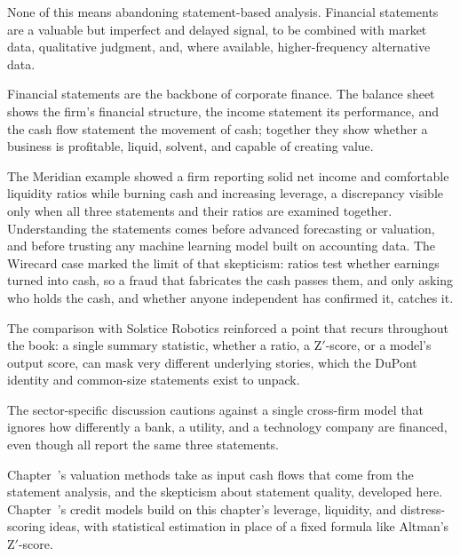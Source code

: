 \documentclass[../ai_in_finance]{subfiles}
\begin{document}
None of this means abandoning statement-based analysis. Financial statements are a valuable but imperfect and delayed signal, to be combined with market data, qualitative judgment, and, where available, higher-frequency alternative data.


Financial statements are the backbone of corporate finance. The balance sheet shows the firm's financial structure, the income statement its performance, and the cash flow statement the movement of cash; together they show whether a business is profitable, liquid, solvent, and capable of creating value.

The Meridian example showed a firm reporting solid net income and comfortable liquidity ratios while burning cash and increasing leverage, a discrepancy visible only when all three statements and their ratios are examined together. Understanding the statements comes before advanced forecasting or valuation, and before trusting any machine learning model built on accounting data. The Wirecard case marked the limit of that skepticism: ratios test whether earnings turned into cash, so a fraud that fabricates the cash passes them, and only asking who holds the cash, and whether anyone independent has confirmed it, catches it.

The comparison with Solstice Robotics reinforced a point that recurs throughout the book: a single summary statistic, whether a ratio, a Z$'$-score, or a model's output score, can mask very different underlying stories, which the DuPont identity and common-size statements exist to unpack.

The sector-specific discussion cautions against a single cross-firm model that ignores how differently a bank, a utility, and a technology company are financed, even though all report the same three statements.

Chapter~'s valuation methods take as input cash flows that come from the statement analysis, and the skepticism about statement quality, developed here. Chapter~'s credit models build on this chapter's leverage, liquidity, and distress-scoring ideas, with statistical estimation in place of a fixed formula like Altman's Z$'$-score.

\end{document}
